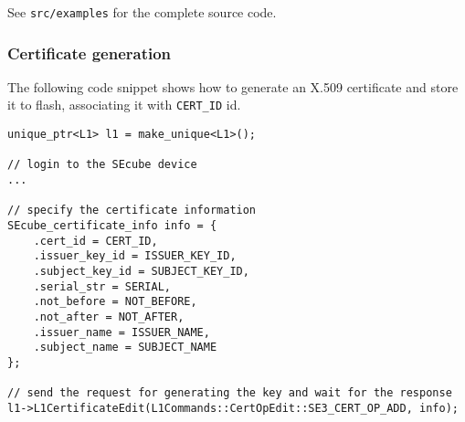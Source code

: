 See \texttt{src/examples} for the complete source code.

\subsubsection{Certificate generation}
The following code snippet shows how to generate an X.509 certificate and store
it to flash, associating it with \texttt{CERT\_ID} id.
\begin{lstlisting}
unique_ptr<L1> l1 = make_unique<L1>();

// login to the SEcube device
...

// specify the certificate information
SEcube_certificate_info info = {
	.cert_id = CERT_ID,
	.issuer_key_id = ISSUER_KEY_ID,
	.subject_key_id = SUBJECT_KEY_ID,
	.serial_str = SERIAL,
	.not_before = NOT_BEFORE,
	.not_after = NOT_AFTER,
	.issuer_name = ISSUER_NAME,
	.subject_name = SUBJECT_NAME
};

// send the request for generating the key and wait for the response
l1->L1CertificateEdit(L1Commands::CertOpEdit::SE3_CERT_OP_ADD, info);
\end{lstlisting}

